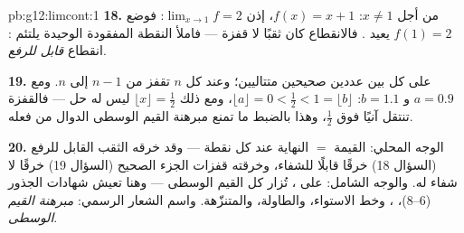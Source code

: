 \begin{solution}{pb:g12:limcont:1}
\textbf{18.} من أجل $x \neq 1$: $f(x) = x + 1$، إذن
$\lim_{x \to 1} f = 2$: فوضع $f(1) = 2$ يعيد
. فالانقطاع كان ثقبًا لا قفزة ---
فاملأ النقطة المفقودة الوحيدة يلتئم :
انقطاع \emph{قابل للرفع}.

\textbf{19.}  على كل  بين عددين صحيحين
متتاليين؛ وعند كل  $n$ تقفز من $n - 1$ إلى $n$.
ومع $a = 0.9$ و $b = 1.1$: $\lfloor a \rfloor = 0 < \frac12 <
1 = \lfloor b \rfloor$، ومع ذلك $\lfloor x \rfloor = \frac12$ ليس له
حل --- فالقفزة تنتقل آنيًا فوق $\frac12$، وهذا بالضبط
ما تمنع مبرهنة القيم الوسطى الدوال  من فعله.

\textbf{20.} الوجه المحلي: القيمة $=$ النهاية عند كل نقطة ---
وقد خرقه الثقب القابل للرفع (السؤال 18) خرقًا قابلًا للشفاء، وخرقته
قفزات الجزء الصحيح (السؤال 19) خرقًا لا شفاء له. والوجه الشامل: على
، تُزار كل القيم الوسطى --- وهنا تعيش شهادات
الجذور (6--8)، ، وخط الاستواء، والطاولة،
والمتنزّهة. واسم الشعار الرسمي: \emph{مبرهنة
القيم الوسطى}.
\end{solution}
